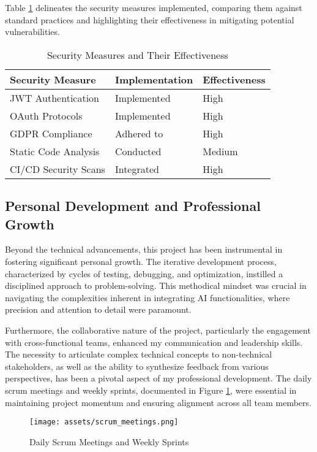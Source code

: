 Table \ref{tab:security_measures} delineates the security measures implemented, comparing them against standard practices and highlighting their effectiveness in mitigating potential vulnerabilities.

\begin{table}[h]
    \centering
    \begin{tabular}{|l|l|l|}
        \hline
        \textbf{Security Measure} & \textbf{Implementation} & \textbf{Effectiveness} \\ \hline
        JWT Authentication & Implemented & High \\ \hline
        OAuth Protocols & Implemented & High \\ \hline
        GDPR Compliance & Adhered to & High \\ \hline
        Static Code Analysis & Conducted & Medium \\ \hline
        CI/CD Security Scans & Integrated & High \\ \hline
    \end{tabular}
    \caption{Security Measures and Their Effectiveness}
    \label{tab:security_measures}
\end{table}

\subsection{Personal Development and Professional Growth}
Beyond the technical advancements, this project has been instrumental in fostering significant personal growth. The iterative development process, characterized by cycles of testing, debugging, and optimization, instilled a disciplined approach to problem-solving. This methodical mindset was crucial in navigating the complexities inherent in integrating \gls{AI} functionalities, where precision and attention to detail were paramount.

Furthermore, the collaborative nature of the project, particularly the engagement with cross-functional teams, enhanced my communication and leadership skills. The necessity to articulate complex technical concepts to non-technical stakeholders, as well as the ability to synthesize feedback from various perspectives, has been a pivotal aspect of my professional development. The daily scrum meetings and weekly sprints, documented in Figure \ref{fig:scrum_meetings}, were essential in maintaining project momentum and ensuring alignment across all team members.

\begin{figure}[h]
    \centering
    \texttt{[image: assets/scrum\_meetings.png]}
    \caption{Daily Scrum Meetings and Weekly Sprints}
    \label{fig:scrum_meetings}
\end{figure}

